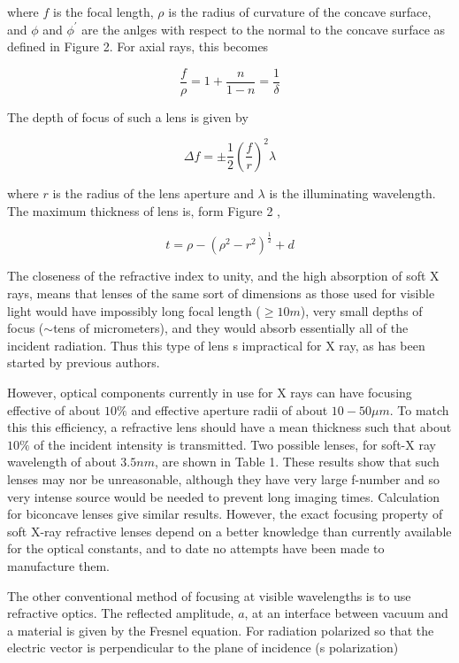 \begin{flushleft}
where $f $ is the focal length, $\rho $ is the radius of curvature of the concave surface, and $\phi $ and $\phi^{'} $ are the anlges with respect to the normal to the concave surface as defined in Figure 2. For axial rays, this becomes
\end{flushleft}

\begin{equation}
	\frac{f}{\rho} = 1 + \frac{n}{1 - n} = \frac{1}{\delta}
	\label{eq: f/rho new}
\end{equation}

\begin{flushleft}
The depth of focus of such a lens is given by
\end{flushleft}

\begin{equation}
	\Delta f = \pm \frac{1}{2} \left( \frac{f}{r} \right)^2 \lambda
	\label{eq: Delta f}	
\end{equation}

\begin{flushleft}
where $r $ is the radius of the lens aperture and $\lambda $ is the illuminating wavelength. The maximum thickness of lens is, form Figure 2 ,
\end{flushleft}

\begin{equation}
	t = \rho - ( \rho^2 - r^2)^{\frac{1}{2}} + d
	\label{eq: t}
\end{equation}

\begin{flushleft}
The closeness of the refractive index to unity, and the high absorption of soft X rays, means that lenses of the same sort of dimensions as those used for visible light would have impossibly long focal length ($\geq 10 m $),  very small depths of focus ($\sim $tens of micrometers), and they would absorb essentially all of the incident radiation. Thus this type of lens s impractical for X ray, as has been started by previous authors.

However, optical components currently in use for X rays can have focusing effective of about $10\% $ and effective aperture radii of about $10-50 \mu m $. To match this this efficiency, a refractive lens should have a mean thickness such that about $10\% $ of the incident intensity is transmitted. Two possible lenses, for soft-X ray wavelength of about $3.5nm $, are shown in Table 1. These results show that such lenses may nor be unreasonable, although they have very large f-number and so very intense source would be needed to prevent long imaging times. Calculation for biconcave lenses give similar results. However, the exact focusing property of soft X-ray refractive lenses depend on a better knowledge than currently available for the optical constants, and to date no attempts have been made to manufacture them.
\end{flushleft}
The other conventional method of focusing at visible wavelengths is to use refractive optics. The reflected amplitude, $a $, at an interface between vacuum and a material is given by the Fresnel equation. For radiation polarized so that the electric vector is perpendicular to the plane of incidence (s polarization)

